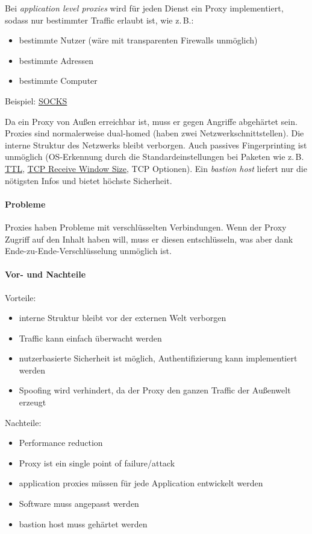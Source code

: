 Bei \emph{application level proxies} wird für jeden Dienst ein Proxy implementiert, sodass
nur bestimmter Traffic erlaubt ist, wie z.\,B.:
\begin{itemize}
  \item bestimmte Nutzer (wäre mit transparenten Firewalls unmöglich)
  \item bestimmte Adressen
  \item bestimmte Computer
\end{itemize}

Beispiel: \href{https://de.wikipedia.org/wiki/SOCKS}{SOCKS}

Da ein Proxy von Außen erreichbar ist, muss er gegen Angriffe abgehärtet sein.
Proxies sind normalerweise dual-homed (haben zwei Netzwerkschnittstellen).
Die interne Struktur des Netzwerks bleibt verborgen.
Auch passives Fingerprinting ist unmöglich (OS-Erkennung durch die Standardeinstellungen
bei Paketen wie z.\,B. \href{https://de.wikipedia.org/wiki/Time_to_Live}{TTL},
\href{https://de.wikipedia.org/wiki/TCP_Receive_Window}{TCP Receive Window Size},
TCP Optionen).
Ein \emph{bastion host} liefert nur die nötigsten Infos und bietet höchste Sicherheit.

\paragraph{Probleme}

Proxies haben Probleme mit verschlüsselten Verbindungen.
Wenn der Proxy Zugriff auf den Inhalt haben will, muss er diesen entschlüsseln, was aber
dank Ende-zu-Ende-Verschlüsselung unmöglich ist.

\paragraph{Vor- und Nachteile}%
\label{par:vor_und_nachteile}

Vorteile:
\begin{itemize}
  \item interne Struktur bleibt vor der externen Welt verborgen
  \item Traffic kann einfach überwacht werden
  \item nutzerbasierte Sicherheit ist möglich, Authentifizierung kann implementiert werden
  \item Spoofing wird verhindert, da der Proxy den ganzen Traffic der Außenwelt erzeugt
\end{itemize}

Nachteile:
\begin{itemize}
  \item Performance reduction
  \item Proxy ist ein single point of failure/attack
  \item application proxies müssen für jede Application entwickelt werden
  \item Software muss angepasst werden
  \item bastion host muss gehärtet werden
\end{itemize}
